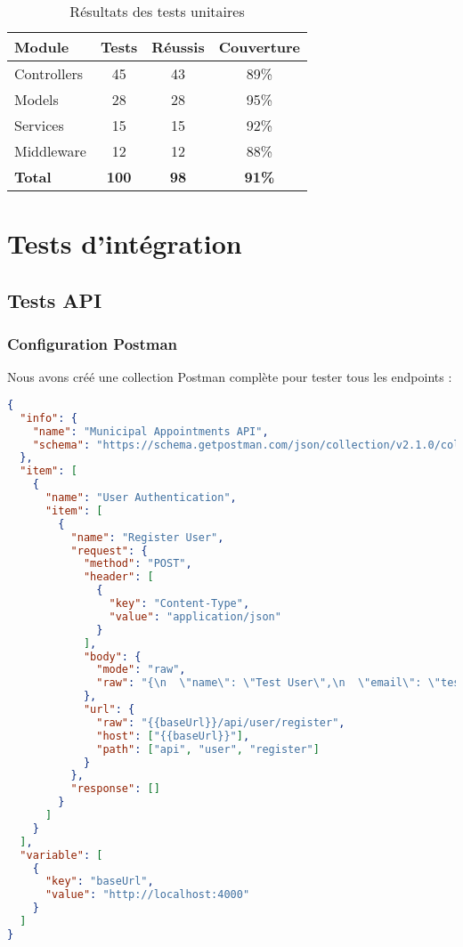 \begin{table}[h]
\centering
\begin{tabular}{|l|c|c|c|}
\hline
\textbf{Module} & \textbf{Tests} & \textbf{Réussis} & \textbf{Couverture} \\
\hline
Controllers & 45 & 43 & 89\% \\
\hline
Models & 28 & 28 & 95\% \\
\hline
Services & 15 & 15 & 92\% \\
\hline
Middleware & 12 & 12 & 88\% \\
\hline
\textbf{Total} & \textbf{100} & \textbf{98} & \textbf{91\%} \\
\hline
\end{tabular}
\caption{Résultats des tests unitaires}
\label{tab:unit_tests}
\end{table}

\section{Tests d'intégration}

\subsection{Tests API}

\subsubsection{Configuration Postman}

Nous avons créé une collection Postman complète pour tester tous les endpoints :

\begin{lstlisting}[language=JSON, caption=Collection Postman (extrait)]
{
  "info": {
    "name": "Municipal Appointments API",
    "schema": "https://schema.getpostman.com/json/collection/v2.1.0/collection.json"
  },
  "item": [
    {
      "name": "User Authentication",
      "item": [
        {
          "name": "Register User",
          "request": {
            "method": "POST",
            "header": [
              {
                "key": "Content-Type",
                "value": "application/json"
              }
            ],
            "body": {
              "mode": "raw",
              "raw": "{\n  \"name\": \"Test User\",\n  \"email\": \"test@example.com\",\n  \"password\": \"password123\"\n}"
            },
            "url": {
              "raw": "{{baseUrl}}/api/user/register",
              "host": ["{{baseUrl}}"],
              "path": ["api", "user", "register"]
            }
          },
          "response": []
        }
      ]
    }
  ],
  "variable": [
    {
      "key": "baseUrl",
      "value": "http://localhost:4000"
    }
  ]
}
\end{lstlisting}

